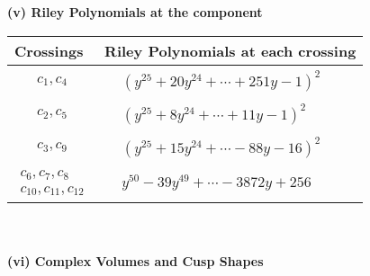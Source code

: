 \documentclass[1p]{elsarticle_modified}
\theoremstyle{definition}
\begin{document}
\newpage\renewcommand{\arraystretch}{1}
\flushleft \textbf{(v) Riley Polynomials at the component}\newline \\
\begin{tabular}{m{50pt}|m{274pt}}
Crossings & \hspace{64pt}Riley Polynomials at each crossing \\
\hline $$\begin{aligned}c_{1},c_{4}\end{aligned}$$&$\begin{aligned}
&(y^{25}+20 y^{24}+\cdots+251 y-1)^{2}
\end{aligned}$\\
\hline $$\begin{aligned}c_{2},c_{5}\end{aligned}$$&$\begin{aligned}
&(y^{25}+8 y^{24}+\cdots+11 y-1)^{2}
\end{aligned}$\\
\hline $$\begin{aligned}c_{3},c_{9}\end{aligned}$$&$\begin{aligned}
&(y^{25}+15 y^{24}+\cdots-88 y-16)^{2}
\end{aligned}$\\
\hline $$\begin{aligned}c_{6},c_{7},c_{8}\\c_{10},c_{11},c_{12}\end{aligned}$$&$\begin{aligned}
&y^{50}-39 y^{49}+\cdots-3872 y+256
\end{aligned}$\\
\hline
\end{tabular}\\~\\
\newpage\flushleft \textbf{(vi) Complex Volumes and Cusp Shapes}
\end{document}
